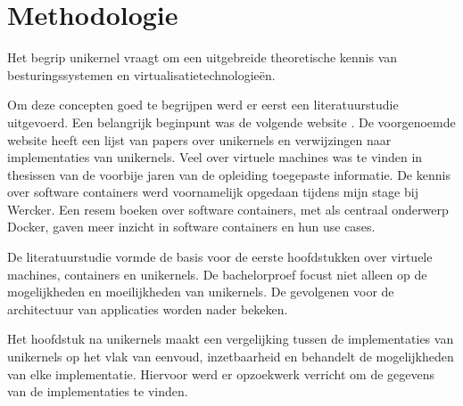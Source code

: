 \chapter{Methodologie}
\label{ch:methodologie}

Het begrip unikernel vraagt om een uitgebreide theoretische kennis van besturingssystemen en virtualisatietechnologieën.

Om deze concepten goed te begrijpen werd er eerst een literatuurstudie uitgevoerd.
Een belangrijk beginpunt was de volgende website \cite{unikernel_systems_unikernels_2016}. De voorgenoemde website heeft een lijst van papers over unikernels en verwijzingen naar implementaties van unikernels.
Veel over virtuele machines was te vinden in thesissen van de voorbije jaren van de opleiding toegepaste informatie. De kennis over software containers werd voornamelijk opgedaan tijdens mijn stage bij Wercker. Een resem boeken over software containers, met als centraal onderwerp Docker, gaven meer inzicht in software containers en hun use cases.

De literatuurstudie vormde de basis voor de eerste hoofdstukken over virtuele machines, containers en unikernels. De bachelorproef focust niet alleen op de mogelijkheden en moeilijkheden van unikernels. De gevolgenen voor de architectuur van applicaties worden nader bekeken.

Het hoofdstuk na unikernels maakt een vergelijking tussen de implementaties van unikernels op het vlak van eenvoud, inzetbaarheid en behandelt de mogelijkheden van elke implementatie. Hiervoor werd er opzoekwerk verricht om de gegevens van de implementaties te vinden.
